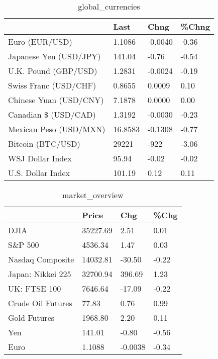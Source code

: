\documentclass{article}%
\begin{document}
%


\begin{table}[htbp]%
\caption{global\_currencies}%
\centering%
\begin{adjustbox}{width=1\textwidth}%
\begin{tabular}{llll}
\toprule
                       &    Last &    Chng & \%Chng \\
\midrule
        Euro (EUR/USD) &  1.1086 & -0.0040 & -0.36 \\
Japanese Yen (USD/JPY) &  141.04 &   -0.76 & -0.54 \\
  U.K. Pound (GBP/USD) &  1.2831 & -0.0024 & -0.19 \\
 Swiss Franc (USD/CHF) &  0.8655 &  0.0009 &  0.10 \\
Chinese Yuan (USD/CNY) &  7.1878 &  0.0000 &  0.00 \\
  Canadian \$ (USD/CAD) &  1.3192 & -0.0030 & -0.23 \\
Mexican Peso (USD/MXN) & 16.8583 & -0.1308 & -0.77 \\
     Bitcoin (BTC/USD) &   29221 &    -922 & -3.06 \\
      WSJ Dollar Index &   95.94 &   -0.02 & -0.02 \\
     U.S. Dollar Index &  101.19 &    0.12 &  0.11 \\
\bottomrule
\end{tabular}
%
\end{adjustbox}%
\end{table}

%


\begin{table}[htbp]%
\caption{market\_overview}%
\centering%
\begin{adjustbox}{width=1\textwidth}%
\begin{tabular}{llll}
\toprule
                  &    Price &     Chg &  \%Chg \\
\midrule
             DJIA & 35227.69 &    2.51 &  0.01 \\
          S\&P 500 &  4536.34 &    1.47 &  0.03 \\
 Nasdaq Composite & 14032.81 &  -30.50 & -0.22 \\
Japan: Nikkei 225 & 32700.94 &  396.69 &  1.23 \\
     UK: FTSE 100 &  7646.64 &  -17.09 & -0.22 \\
Crude Oil Futures &    77.83 &    0.76 &  0.99 \\
     Gold Futures &  1968.80 &    2.20 &  0.11 \\
              Yen &   141.01 &   -0.80 & -0.56 \\
             Euro &   1.1088 & -0.0038 & -0.34 \\
\bottomrule
\end{tabular}
%
\end{adjustbox}%
\end{table}

%
\end{document}
